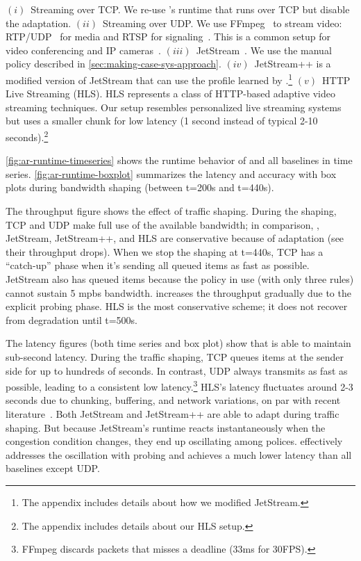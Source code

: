  $(i)$~Streaming over TCP. We re-use \sysname{}'s runtime that
runs over TCP but disable the adaptation. $(ii)$~Streaming over UDP. We use
FFmpeg~\cite{bellard2012ffmpeg} to stream video:
RTP/UDP~\cite{schulzrinne2006rtp} for media and RTSP for
signaling~\cite{schulzrinne1998rtsp}. This is a common setup for video
conferencing and IP cameras~\cite{durresi2005rtp,
  king2009cisco}. $(iii)$~JetStream~\cite{rabkin2014aggregation}. We use the
manual policy described in
\autoref{sec:making-case-sys-approach}. $(iv)$~JetStream++ is a modified version
of JetStream that can use the profile learned by \sysname{}.\footnote{The
  appendix includes details about how we modified JetStream.} $(v)$~HTTP Live
Streaming (HLS). HLS represents a class of HTTP-based adaptive video streaming
techniques. Our setup resembles personalized live streaming
systems~\cite{wang2016anatomy} but uses a smaller chunk for low latency (1
second instead of typical 2-10 seconds).\footnote{The appendix includes details
  about our HLS setup.}

 \autoref{fig:ar-runtime-timeseries} shows the runtime behavior
of \sysname{} and all baselines in time series. \autoref{fig:ar-runtime-boxplot}
summarizes the latency and accuracy with box plots during bandwidth shaping
(between t=200s and t=440s).

The throughput figure shows the effect of traffic shaping. During the shaping,
TCP and UDP make full use of the available bandwidth; in comparison, \sysname{},
JetStream, JetStream++, and HLS are conservative because of adaptation (see
their throughput drops). When we stop the shaping at t=440s, TCP has a
``catch-up'' phase when it's sending all queued items as fast as
possible. JetStream also has queued items because the policy in use (with only
three rules) cannot sustain 5 mpbs bandwidth. \sysname{} increases the
throughput gradually due to the explicit probing phase. HLS is the most
conservative scheme; it does not recover from degradation until t=500s.

The latency figures (both time series and box plot) show that \sysname{} is able
to maintain sub-second latency. During the traffic shaping, TCP queues items at
the sender side for up to hundreds of seconds. In contrast, UDP always transmits
as fast as possible, leading to a consistent low latency.\footnote{FFmpeg
  discards packets that misses a deadline (33ms for 30FPS).} HLS's latency
fluctuates around 2-3 seconds due to chunking, buffering, and network
variations, on par with recent literature~\cite{wang2016anatomy}. Both JetStream
and JetStream++ are able to adapt during traffic shaping. But because
JetStream's runtime reacts instantaneously when the congestion condition
changes, they end up oscillating among polices. \sysname{} effectively addresses
the oscillation with probing and achieves a much lower latency than all
baselines except UDP.

